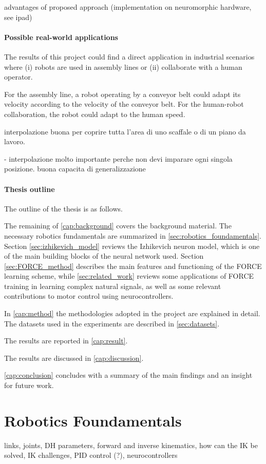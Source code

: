 \documentclass[10pt,a4paper, final]{report} %
\begin{document}
advantages of proposed approach (implementation on neuromorphic hardware, see ipad)

\paragraph{Possible real-world applications}
The results of this project could find a direct application in industrial scenarios where (i) robots are used in assembly lines or (ii) collaborate with a human operator.

For the assembly line, a robot operating by a conveyor belt could adapt its velocity according to the velocity of the conveyor belt. For the human-robot collaboration, the robot could adapt to the human speed.

interpolazione buona per coprire tutta l'area di uno scaffale o di un piano da lavoro.

- interpolazione molto importante perche non devi imparare ogni singola posizione. buona
  capacita di generalizzazione

\paragraph{Thesis outline}
The outline of the thesis is as follows. 

The remaining of \autoref{cap:background} covers the background material. The necessary robotics fundamentals are summarized in \autoref{sec:robotics_foundamentals}. 
Section \ref{sec:izhikevich_model} reviews the Izhikevich neuron model, which is one of the main building blocks of the neural network used. Section \ref{sec:FORCE_method} describes the main features and functioning of the FORCE learning scheme, while \autoref{sec:related_work} reviews some applications of FORCE training in learning complex natural signals, as well as some relevant contributions to motor control using neurocontrollers.

In \autoref{cap:method} the methodologies adopted in the project are explained in detail. The datasets used in the experiments are described in \autoref{sec:datasets}. 

The results are reported in \autoref{cap:result}. 

The results are discussed in \autoref{cap:discussion}. 

\autoref{cap:conclusion} concludes with a summary of the main findings and an insight for future work.

\section{Robotics Foundamentals}
\label{sec:robotics_foundamentals}
links, joints, DH parameters, forward and inverse kinematics, how can the IK be solved, IK challenges, PID control (?), neurocontrollers
\end{document}
